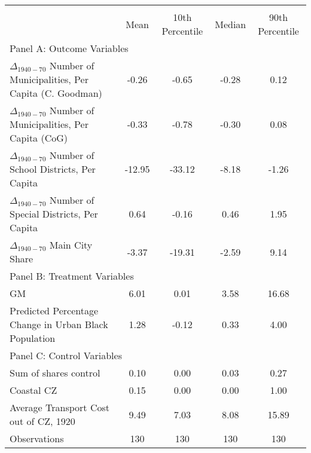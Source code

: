  \begin{tabular}{l*{4}{c}} \toprule
                &\multicolumn{4}{c}{}                   \\
                &     Mean&10th Percentile&   Median&90th Percentile\\
\cmidrule(lr){1-5}
\multicolumn{5}{l}{Panel A: Outcome Variables}\\
\cmidrule(lr){1-5}
$\Delta_{1940-70}$ Number of Municipalities, Per Capita (C. Goodman)&    -0.26&    -0.65&    -0.28&     0.12\\
$\Delta_{1940-70}$ Number of Municipalities, Per Capita (CoG)&    -0.33&    -0.78&    -0.30&     0.08\\
$\Delta_{1940-70}$ Number of School Districts, Per Capita&   -12.95&   -33.12&    -8.18&    -1.26\\
$\Delta_{1940-70}$ Number of Special Districts, Per Capita&     0.64&    -0.16&     0.46&     1.95\\
$\Delta_{1940-70}$ Main City Share&    -3.37&   -19.31&    -2.59&     9.14\\
\cmidrule(lr){1-5}
\multicolumn{5}{l}{Panel B: Treatment Variables}\\
\cmidrule(lr){1-5}
GM              &     6.01&     0.01&     3.58&    16.68\\
Predicted Percentage Change in Urban Black Population&     1.28&    -0.12&     0.33&     4.00\\
\cmidrule(lr){1-5}
\multicolumn{5}{l}{Panel C: Control Variables}\\
\cmidrule(lr){1-5}
Sum of shares control&     0.10&     0.00&     0.03&     0.27\\
Coastal CZ      &     0.15&     0.00&     0.00&     1.00\\
Average Transport Cost out of CZ, 1920&     9.49&     7.03&     8.08&    15.89\\
\midrule Observations    &      130   &      130   &      130   &      130   \\    \bottomrule \end{tabular}
